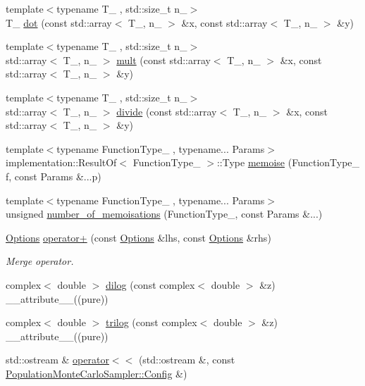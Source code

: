 \begin{DoxyCompactItemize}
\item 
{\footnotesize template$<$typename T\_\- , std::size\_\-t n\_\-$>$ }\\T\_\- \hyperlink{namespaceeos_ac3181f83f30b4811151158ffc68a5396}{dot} (const std::array$<$ T\_\-, n\_\- $>$ \&x, const std::array$<$ T\_\-, n\_\- $>$ \&y)
\item 
{\footnotesize template$<$typename T\_\- , std::size\_\-t n\_\-$>$ }\\std::array$<$ T\_\-, n\_\- $>$ \hyperlink{namespaceeos_ae34de7634e8e232a4a7761b998e1535f}{mult} (const std::array$<$ T\_\-, n\_\- $>$ \&x, const std::array$<$ T\_\-, n\_\- $>$ \&y)
\item 
{\footnotesize template$<$typename T\_\- , std::size\_\-t n\_\-$>$ }\\std::array$<$ T\_\-, n\_\- $>$ \hyperlink{namespaceeos_a8031207b4e14e35ca72988b76bfaacf1}{divide} (const std::array$<$ T\_\-, n\_\- $>$ \&x, const std::array$<$ T\_\-, n\_\- $>$ \&y)
\item 
{\footnotesize template$<$typename FunctionType\_\- , typename... Params$>$ }\\implementation::ResultOf$<$ FunctionType\_\- $>$::Type \hyperlink{namespaceeos_a145cd9427e62a28f1144614e2b9a3d7d}{memoise} (FunctionType\_\- f, const Params \&...p)
\item 
{\footnotesize template$<$typename FunctionType\_\- , typename... Params$>$ }\\unsigned \hyperlink{namespaceeos_a82ca3bc4794ddeca0b97d4a66fa5a679}{number\_\-of\_\-memoisations} (FunctionType\_\-, const Params \&...)
\item 
\hyperlink{classeos_1_1Options}{Options} \hyperlink{namespaceeos_a41f7ab5320df3415314366aef9a258bf}{operator+} (const \hyperlink{classeos_1_1Options}{Options} \&lhs, const \hyperlink{classeos_1_1Options}{Options} \&rhs)
\begin{DoxyCompactList}\small\item\em Merge operator. \item\end{DoxyCompactList}\item 
complex$<$ double $>$ \hyperlink{namespaceeos_a7fb80dc36d6e29adfbde318a197ea591}{dilog} (const complex$<$ double $>$ \&z) \_\-\_\-attribute\_\-\_\-((pure))
\item 
complex$<$ double $>$ \hyperlink{namespaceeos_a38a0279ef72ff9c1bdb17dd7956a199a}{trilog} (const complex$<$ double $>$ \&z) \_\-\_\-attribute\_\-\_\-((pure))
\item 
std::ostream \& \hyperlink{namespaceeos_ae82806395b35652601c81a77cdf89fae}{operator$<$$<$} (std::ostream \&, const \hyperlink{structeos_1_1PopulationMonteCarloSampler_1_1Config}{PopulationMonteCarloSampler::Config} \&)

\end{DoxyCompactItemize}
